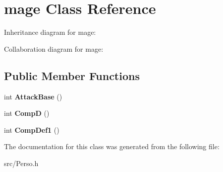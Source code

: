 \hypertarget{classmage}{}\section{mage Class Reference}
\label{classmage}


Inheritance diagram for mage\+:


Collaboration diagram for mage\+:
\subsection*{Public Member Functions}
\begin{DoxyCompactItemize}
\item 
int {\bfseries Attack\+Base} ()\hypertarget{classmage_adf9223f5db24f0f10232d57e85cd01a1}{}\label{classmage_adf9223f5db24f0f10232d57e85cd01a1}

\item 
int {\bfseries CompD} ()\hypertarget{classmage_a9f3aec41e35276023c324bd041d1bdbc}{}\label{classmage_a9f3aec41e35276023c324bd041d1bdbc}

\item 
int {\bfseries Comp\+Def1} ()\hypertarget{classmage_a377bad39b6c9e6c98698f620583e6f25}{}\label{classmage_a377bad39b6c9e6c98698f620583e6f25}

\end{DoxyCompactItemize}


The documentation for this class was generated from the following file\+:\begin{DoxyCompactItemize}
\item 
src/Perso.\+h\end{DoxyCompactItemize}
